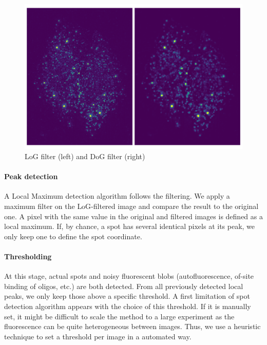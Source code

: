 \begin{figure}[h]
    \centering
    \includegraphics[width=1\textwidth]{figures/chapter2/filter_background}
    \caption{\ac{LoG} filter (left) and \ac{DoG} filter (right)}
    \label{fig:filters_detection}
\end{figure}

\paragraph{Peak detection}

A Local Maximum detection algorithm follows the filtering.
We apply a maximum filter on the \ac{LoG}-filtered image and compare the result to the original one.
A pixel with the same value in the original and filtered images is defined as a local maximum.
If, by chance, a spot has several identical pixels at its peak, we only keep one to define the spot coordinate.


\paragraph{Thresholding}

At this stage, actual spots and noisy fluorescent blobs (autofluorescence, of-site binding of oligos, etc.) are both detected.
From all previously detected local peaks, we only keep those above a specific threshold.
A first limitation of spot detection algorithm appears with the choice of this threshold.
If it is manually set, it might be difficult to scale the method to a large experiment as the fluorescence can be quite heterogeneous between images.
Thus, we use a heuristic technique to set a threshold per image in a automated way.

